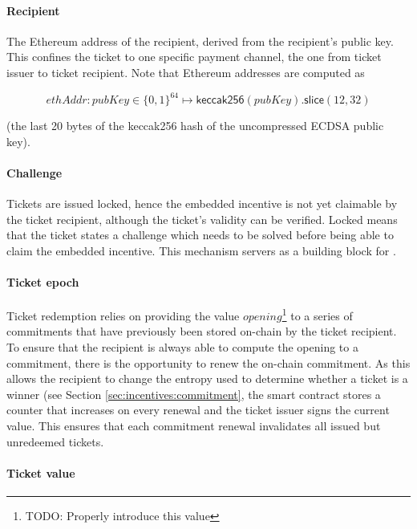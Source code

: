 \paragraph{Recipient}
\label{sec:tickets:issuance:recipient}

The Ethereum address of the recipient, derived from the recipient's public key. This confines the ticket to one specific payment channel, the one from ticket issuer to ticket recipient. Note that Ethereum addresses are computed as

$$ ethAddr: pubKey \in \{ 0,1 \}^{64} \mapsto \mathsf{keccak256}( pubKey).\mathsf{slice}(12,32)$$

(the last 20 bytes of the keccak256 hash of the uncompressed ECDSA public key).

\paragraph{Challenge}
\label{sec:tickets:issuance:challenge}

Tickets are issued locked, hence the embedded incentive is not yet claimable by the ticket recipient, although the ticket's validity can be verified. Locked means that the ticket states a challenge which needs to be solved before being able to claim the embedded incentive. This mechanism servers as a building block for .

\paragraph{Ticket epoch}
\label{sec:tickets:issuance:ticketepoch}

Ticket redemption relies on providing the value $opening$\footnote{TODO: Properly introduce this value} to a series of commitments that have previously been stored on-chain by the ticket recipient. To ensure that the recipient is always able to compute the opening to a commitment, there is the opportunity to renew the on-chain commitment. As this allows the recipient to change the entropy used to determine whether a ticket is a winner (see Section \ref{sec:incentives:commitment}, the smart contract stores a counter that increases on every renewal and the ticket issuer signs the current value. This ensures that each commitment renewal invalidates all issued but unredeemed tickets.

\paragraph{Ticket value}
\label{sec:tickets:issuance:ticketvalue}

